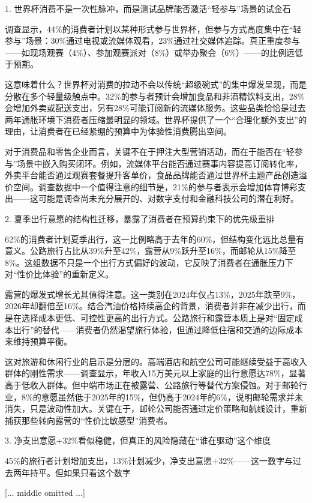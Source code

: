 \documentclass[11pt]{ctexart}
\begin{document}
1. 世界杯消费不是一次性脉冲，而是测试品牌能否激活“轻参与”场景的试金石

调查显示，44\%的消费者计划以某种形式参与世界杯，但参与方式高度集中在“轻参与”场景：30\%通过电视或流媒体观看，23\%通过社交媒体追踪。真正重度参与——如现场观赛（4\%）、参加观赛派对（8\%）或举办聚会（6\%）——的比例远低于预期。

这意味着什么？世界杯对消费的拉动不会以传统“超级碗式”的集中爆发呈现，而是分散在多个轻量级触点中。32\%的参与者预计会增加食品和非酒精饮料支出，28\%会增加外卖或配送支出，另有28\%可能订阅新的流媒体服务。这些品类恰恰是过去两年通胀环境下消费者压缩最明显的领域。世界杯提供了一个“合理化额外支出”的理由，让消费者在已经紧绷的预算中为体验性消费腾出空间。

对于消费品和零售企业而言，关键不在于押注大型营销活动，而在于能否在“轻参与”场景中嵌入购买闭环。例如，流媒体平台能否通过赛事内容提高订阅转化率，外卖平台能否通过观赛套餐提升客单价，食品品牌能否通过世界杯主题产品创造溢价空间。调查数据中一个值得注意的细节是，21\%的参与者表示会增加体育博彩支出——这可能是调查尚未充分展开的、对数字支付和金融科技公司的潜在利好。

2. 夏季出行意愿的结构性迁移，暴露了消费者在预算约束下的优先级重排

62\%的消费者计划夏季出行，这一比例略高于去年的60\%，但结构变化远比总量有意义。公路旅行占比从39\%升至42\%，露营从9\%跃升至16\%，而邮轮从15\%降至8\%。这组数据不只是一个出行方式偏好的波动，它反映了消费者在通胀压力下对“性价比体验”的重新定义。

露营的爆发式增长尤其值得注意。这一类别在2024年仅占13\%，2025年跌至9\%，2026年却翻倍至16\%。结合汽油价格持续高企的背景，消费者并非在减少出行，而是在选择成本更低、可控性更高的出行方式。公路旅行和露营本质上是对“固定成本出行”的替代——消费者仍然渴望旅行体验，但通过降低住宿和交通的边际成本来维持预算平衡。

这对旅游和休闲行业的启示是分层的。高端酒店和航空公司可能继续受益于高收入群体的刚性需求——调查显示，年收入15万美元以上家庭的出行意愿达78\%，显著高于低收入群体。但中端市场正在被露营、公路旅行等替代方案侵蚀。对于邮轮行业，8\%的意愿虽然低于2025年的15\%，但仍高于2024年的6\%，说明邮轮需求并未消失，只是波动性加大。关键在于，邮轮公司能否通过定价策略和航线设计，重新捕获那些转向露营的“性价比敏感型”消费者。

3. 净支出意愿+32\%看似稳健，但真正的风险隐藏在“谁在驱动”这个维度

45\%的旅行者计划增加支出，13\%计划减少，净支出意愿+32\%——这一数字与过去两年持平。但如果只看这个数字

[... middle omitted ...]
\end{document}
